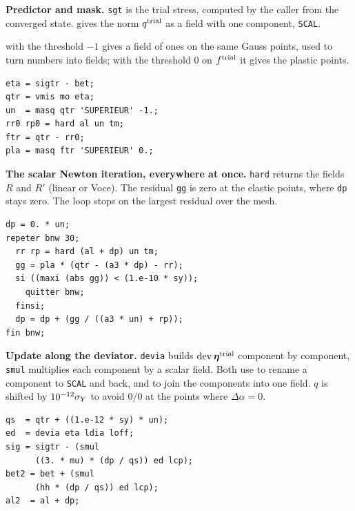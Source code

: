 \begin{castemcom}
\textbf{Predictor and mask.} \texttt{sgt} is the trial stress, computed by
the caller from the converged state.  gives the norm $q^{\mathrm{trial}}$ as a
field with one component, \texttt{SCAL}.

 with the threshold $-1$ gives a field of ones on the same Gauss
points, used to turn numbers into fields; with the threshold 0 on
$f^{\mathrm{trial}}$ it gives the plastic points.
\end{castemcom}
\begin{castemlines}
\begin{verbatim}
eta = sigtr - bet;
qtr = vmis mo eta;
un  = masq qtr 'SUPERIEUR' -1.;
rr0 rp0 = hard al un tm;
ftr = qtr - rr0;
pla = masq ftr 'SUPERIEUR' 0.;
\end{verbatim}
\end{castemlines}
\begin{castemcom}
\textbf{The scalar Newton iteration, everywhere at once.} \texttt{hard}
returns the fields $R$ and $R'$ (linear or Voce). The residual \texttt{gg}
is zero at the elastic points, where \texttt{dp} stays zero. The loop stops
on the largest residual over the mesh.
\end{castemcom}
\begin{castemlines}
\begin{verbatim}
dp = 0. * un;
repeter bnw 30;
  rr rp = hard (al + dp) un tm;
  gg = pla * (qtr - (a3 * dp) - rr);
  si ((maxi (abs gg)) < (1.e-10 * sy));
    quitter bnw;
  finsi;
  dp = dp + (gg / ((a3 * un) + rp));
fin bnw;
\end{verbatim}
\end{castemlines}
\begin{castemcom}
\textbf{Update along the deviator.} \texttt{devia} builds
$\operatorname{dev}\bm{\eta}^{\mathrm{trial}}$ component by component, \texttt{smul} multiplies each
component by a scalar field. Both use  to rename a component to
\texttt{SCAL} and back, and  to join the components into one field.
$q$ is shifted by $10^{-12}\sigma_{Y}$ to avoid $0/0$ at the points where
$\Delta\alpha=0$.
\end{castemcom}
\begin{castemlines}
\begin{verbatim}
qs  = qtr + ((1.e-12 * sy) * un);
ed  = devia eta ldia loff;
sig = sigtr - (smul
      ((3. * mu) * (dp / qs)) ed lcp);
bet2 = bet + (smul
      (hh * (dp / qs)) ed lcp);
al2  = al + dp;
\end{verbatim}
\end{castemlines}

